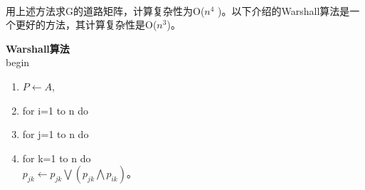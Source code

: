 \documentclass[11pt,a4paper,openany]{book}
\begin{document}
\paragraph{}用上述方法求G的道路矩阵，计算复杂性为Ο($n^4$ )。以下介绍的Warshall算法是一个更好的方法，其计算复杂性是Ο($n^3$)。
\begin{adjustwidth}{0.62cm}{0.62cm}
\textbf{Warshall算法}\\
begin\\
\begin{enumerate}
\item $P\leftarrow A$,
\item for i=1 to n do
\item \quad for j=1 to n do
\item \qquad for k=1 to n do\\ \indent\quad$p_{jk}\leftarrow p_{jk}\bigvee(p_{jk}\bigwedge p_{ik})$。
\end{enumerate}
\end{adjustwidth}
\end{document}
